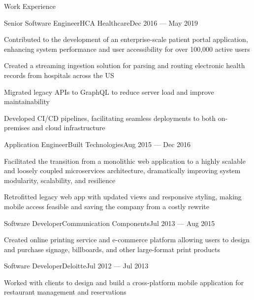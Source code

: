 \documentclass{resume} %
\begin{document}
\begin{rSection}{Work Experience}
\begin{rWorkHistoryItem}{Senior Software Engineer}{HCA Healthcare}{Dec 2016 --- May 2019}
          \item Contributed to the development of an enterprise-scale patient portal application, enhancing system performance and user accessibility for over 100,000 active users
          \item Created a streaming ingestion solution for parsing and routing electronic health records from hospitals across the US
          \item Migrated legacy APIs to GraphQL to reduce server load and improve maintainability
          \item Developed CI/CD pipelines, facilitating seamless deployments to both on-premises and cloud infrastructure
      \end{rWorkHistoryItem}
      \begin{rWorkHistoryItem}{Application Engineer}{Built Technologies}{Aug 2015 --- Dec 2016}
          \item Facilitated the transition from a monolithic web application to a highly scalable and loosely coupled microservices architecture, dramatically improving system modularity, scalability, and resilience
          \item Retrofitted legacy web app with updated views and responsive styling, making mobile access feasible and saving the company from a costly rewrite
      \end{rWorkHistoryItem}
      \begin{rWorkHistoryItem}{Software Developer}{Communication Components}{Jul 2013 --- Aug 2015}
          \item Created online printing service and e-commerce platform allowing users to design and purchase signage, billboards, and other large-format print products
      \end{rWorkHistoryItem}
      \begin{rWorkHistoryItem}{Software Developer}{Deloitte}{Jul 2012 --- Jul 2013}
          \item Worked with clients to design and build a cross-platform mobile application for restaurant management and reservations
      \end{rWorkHistoryItem}

  \end{rSection}

\end{document}
